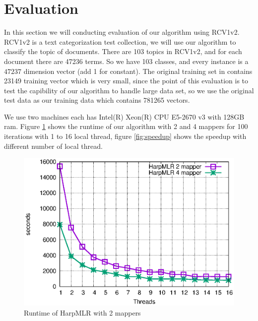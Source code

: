 \documentclass{sig-alternate-05-2015}
\begin{document}
\section{Evaluation}\label{sec:eval}
In this section we will conducting evaluation of our algorithm using RCV1v2\cite{Lewis:2004:RNB:1005332.1005345}.
RCV1v2 is a text categorization test collection, we will use our algorithm to classify the topic of documents.
There are 103 topics in RCV1v2, and for each document there are 47236 terms.
So we have 103 classes, and every instance is a $47237$ dimension vector (add 1 for constant).
The original training set in \cite{Lewis:2004:RNB:1005332.1005345} contains 23149 training vector which is very small,
since the point of this evaluation is to test the capibility of our algorithm to handle large data set,
so we use the original test data as our training data which contains 781265 vectors.\par
We use two machines each has Intel(R) Xeon(R) CPU E5-2670 v3 with 128GB ram.
Figure \ref{fig:runtime} shows the runtime of our algorithm with 2 and 4 mappers for 100 iterations with 1 to 16 local thread,
figure \ref{fig:speedup} shows the speedup with different number of local thread.
\begin{figure}
  \includegraphics[scale=0.7]{fig/runtime.eps}
  \caption{Runtime of HarpMLR with 2 mappers}
  \label{fig:runtime}
\end{figure}
\end{document}

